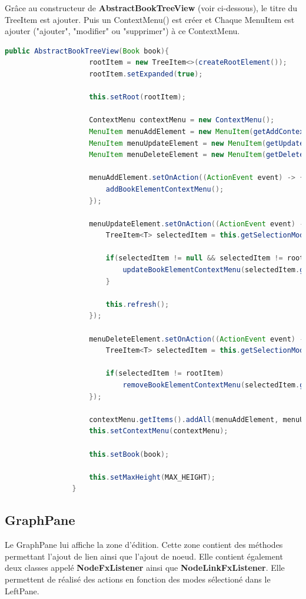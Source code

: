 			Grâce au constructeur de \textbf{AbstractBookTreeView} (voir ci-dessous), le titre du TreeItem est ajouter. Puis un ContextMenu() est créer et Chaque MenuItem est ajouter ("ajouter", "modifier" ou "supprimer") à ce ContextMenu.

			\begin{lstlisting}[gobble=12, language=java, caption=Constructeur de AbstractBookTreeView()]
				public AbstractBookTreeView(Book book){
					rootItem = new TreeItem<>(createRootElement());
					rootItem.setExpanded(true);

					this.setRoot(rootItem);

					ContextMenu contextMenu = new ContextMenu();
					MenuItem menuAddElement = new MenuItem(getAddContextMenuString());
					MenuItem menuUpdateElement = new MenuItem(getUpdateContextMenuString());
					MenuItem menuDeleteElement = new MenuItem(getDeleteContextMenuString());

					menuAddElement.setOnAction((ActionEvent event) -> {
						addBookElementContextMenu();
					});

					menuUpdateElement.setOnAction((ActionEvent event) -> {
						TreeItem<T> selectedItem = this.getSelectionModel().getSelectedItem();

						if(selectedItem != null && selectedItem != rootItem) {
							updateBookElementContextMenu(selectedItem.getValue());
						}

						this.refresh();
					});

					menuDeleteElement.setOnAction((ActionEvent event) -> {
						TreeItem<T> selectedItem = this.getSelectionModel().getSelectedItem();

						if(selectedItem != rootItem)
							removeBookElementContextMenu(selectedItem.getValue());
					});

					contextMenu.getItems().addAll(menuAddElement, menuUpdateElement, menuDeleteElement);
					this.setContextMenu(contextMenu);

					this.setBook(book);

					this.setMaxHeight(MAX_HEIGHT);
				}
			\end{lstlisting}

		\subsection{GraphPane}\label{sub:GraphPane}

			Le GraphPane lui affiche la zone d'édition. Cette zone contient des méthodes permettant l'ajout de lien ainsi que l'ajout de noeud. Elle contient également deux classes appelé \textbf{NodeFxListener} ainsi que \textbf{NodeLinkFxListener}. Elle permettent de réalisé des actions en fonction des modes sélectioné dans le LeftPane.

